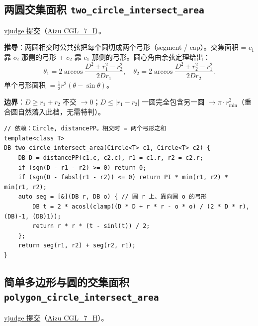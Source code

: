 		\subsection{两圆交集面积 \texttt{two\_circle\_intersect\_area}}

		\href{https://vjudge.net/solution/69929585}{vjudge 提交}（\href{https://vjudge.net/problem/Aizu-CGL_7_I}{Aizu CGL\_7\_I}）。

		\textbf{推导}：两圆相交时公共弦把每个圆切成两个弓形（segment / cap）。交集面积 = $c_1$ 靠 $c_2$ 那侧的弓形 + $c_2$ 靠 $c_1$ 那侧的弓形。圆心角由余弦定理给出：
		$$\theta_1 = 2 \arccos \frac{D^2 + r_1^2 - r_2^2}{2 D r_1}, \quad \theta_2 = 2 \arccos \frac{D^2 + r_2^2 - r_1^2}{2 D r_2}.$$
		单个弓形面积 $= \tfrac{1}{2} r^2 (\theta - \sin \theta)$。

		\textbf{边界}：$D \ge r_1 + r_2$ 不交 $\to 0$；$D \le |r_1 - r_2|$ 一圆完全包含另一圆 $\to \pi \cdot r_{\min}^2$（重合圆自然落入此档，无需特判）。

\begin{verbatim}
// 依赖：Circle, distancePP。相交时 = 两个弓形之和
template<class T>
DB two_circle_intersect_area(Circle<T> c1, Circle<T> c2) {
	DB D = distancePP(c1.c, c2.c), r1 = c1.r, r2 = c2.r;
	if (sgn(D - r1 - r2) >= 0) return 0;
	if (sgn(D - fabsl(r1 - r2)) <= 0) return PI * min(r1, r2) * min(r1, r2);
	auto seg = [&](DB r, DB o) { // 圆 r 上、靠向圆 o 的弓形
		DB t = 2 * acosl(clamp((D * D + r * r - o * o) / (2 * D * r), (DB)-1, (DB)1));
		return r * r * (t - sinl(t)) / 2;
	};
	return seg(r1, r2) + seg(r2, r1);
}
\end{verbatim}

		\subsection[\tochl{简单多边形与圆的交集面积 \texttt{polygon\_circle\_intersect\_area}}]{简单多边形与圆的交集面积 \texttt{polygon\_circle\_intersect\_area}}

		\href{https://vjudge.net/solution/69929628}{vjudge 提交}（\href{https://vjudge.net/problem/Aizu-CGL_7_H}{Aizu CGL\_7\_H}）。

